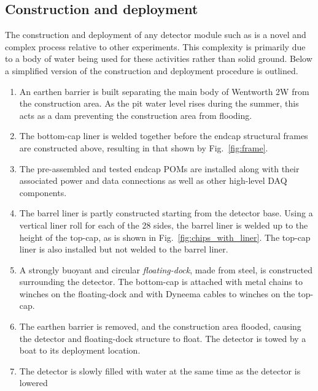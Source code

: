 \subsection{Construction and deployment} %
\label{sec:chips_detector_deployment} %

The construction and deployment of any \chips detector module such as \chipsfive is a novel and
complex process relative to other experiments. This complexity is primarily due to a body of water
being used for these activities rather than solid ground. Below a simplified version of the
\chipsfive construction and deployment procedure is outlined.

\begin{enumerate}
    \item An earthen barrier is built separating the main body of Wentworth 2W from the
          construction area. As the pit water level rises during the summer, this acts as a dam
          preventing the construction area from flooding.
    \item The bottom-cap liner is welded together before the endcap structural frames are
          constructed above, resulting in that shown by Fig.~\ref{fig:frame}.
    \item The pre-assembled and tested endcap POMs are installed along with their associated power
          and data connections as well as other high-level DAQ components.
    \item The barrel liner is partly constructed starting from the detector base. Using a vertical
          liner roll for each of the 28 sides, the barrel liner is welded up to the height of the
          top-cap, as is shown in Fig.~\ref{fig:chips_with_liner}. The top-cap liner is also
          installed but not welded to the barrel liner.
    \item A strongly buoyant and circular \emph{floating-dock}, made from steel, is constructed
          surrounding the detector. The bottom-cap is attached with metal chains to winches on the
          floating-dock and with Dyneema cables to winches on the top-cap.
    \item The earthen barrier is removed, and the construction area flooded, causing the detector
          and floating-dock structure to float. The detector is towed by a boat to its deployment
          location.
    \item The detector is slowly filled with water at the same time as the detector is lowered

\end{enumerate}

